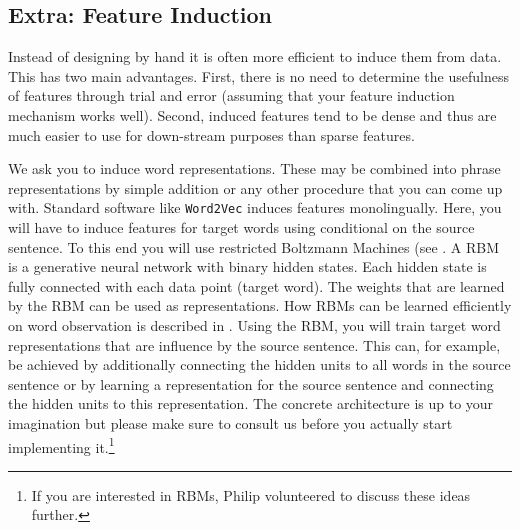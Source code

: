 \subsection{Extra: Feature Induction}

Instead of designing by hand it is often more efficient to induce them from data. This has two main advantages. First, there is no need to determine the usefulness of 
features through trial and error (assuming that your feature induction mechanism works well). Second, induced features tend to be dense and thus are much easier to
use for down-stream purposes than sparse features. 

We ask you to induce word representations. These may be combined into phrase representations by simple addition or any other procedure that you can come up with.
Standard software like \texttt{Word2Vec} induces features monolingually. Here, you will have to induce features for target words using conditional on the source sentence.
To this end you will use restricted Boltzmann Machines (see \cite{HintonEtAl:2006}. A RBM is a generative neural network with binary hidden states. Each hidden state is 
fully connected with each data point (target word). The weights that are learned by the RBM can be used as representations. How RBMs can be learned efficiently on word
observation is described in \cite{DahlEtAl:2012}. Using the RBM, you will train target word representations that are influence by the source sentence. This can, for 
example, be achieved by additionally connecting the hidden units to all words in the source sentence or by learning a representation for the source sentence and connecting 
the hidden units to this representation. The concrete architecture is up to your imagination but please make sure to consult us before you actually start implementing it.\footnote{If you are interested in RBMs, Philip volunteered to discuss these ideas further.}